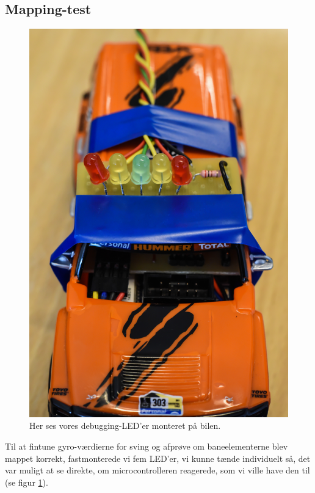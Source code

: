 \subsection{Mapping-test}
\begin{figure}
	\begin{minipage}{.3\textwidth}
	\centering
		\includegraphics[scale=0.02]{Billeder/Debug-lys.JPG}
	\caption{Her ses vores debugging-LED'er monteret på bilen.}
	\label{fig:Udrykning}
	\end{minipage}
\end{figure}
Til at fintune gyro-værdierne for sving og afprøve om baneelementerne blev mappet korrekt, fastmonterede vi fem LED'er, vi kunne tænde individuelt så, det var muligt at se direkte, om microcontrolleren reagerede, som vi ville have den til (se figur \ref{fig:Udrykning}).

